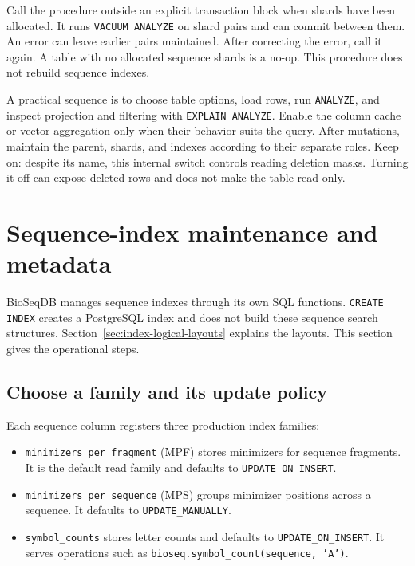 Call the procedure outside an explicit transaction block when shards have
been allocated. It runs \texttt{VACUUM ANALYZE} on shard pairs and can
commit between them. An error can leave earlier pairs maintained. After
correcting the error, call it again. A table with no allocated sequence
shards is a no-op. This procedure does not rebuild sequence indexes.

A practical sequence is to choose table options, load rows, run
\texttt{ANALYZE}, and inspect projection and filtering with
\texttt{EXPLAIN ANALYZE}. Enable the column cache or vector aggregation
only when their behavior suits the query. After mutations, maintain the
parent, shards, and indexes according to their separate roles.
Keep  on: despite its name, this internal
switch controls reading deletion masks. Turning it off can expose deleted
rows and does not make the table read-only.

\section{Sequence-index maintenance and metadata}
\label{sec:appendix-indexes}

BioSeqDB manages sequence indexes through its own SQL functions.
\texttt{CREATE INDEX} creates a PostgreSQL index and does not build these
sequence search structures. Section~\ref{sec:index-logical-layouts}
explains the layouts. This section gives the operational steps.

\subsection{Choose a family and its update policy}

Each sequence column registers three production index families:
\begin{itemize}
  \item \texttt{minimizers\_per\_fragment} (MPF) stores minimizers for
    sequence fragments. It is the default read family and defaults to
    \texttt{UPDATE\_ON\_INSERT}.
  \item \texttt{minimizers\_per\_sequence} (MPS) groups minimizer
    positions across a sequence. It defaults to
    \texttt{UPDATE\_MANUALLY}.
  \item \texttt{symbol\_counts} stores letter counts and defaults to
    \texttt{UPDATE\_ON\_INSERT}. It serves operations such as
    \texttt{bioseq.symbol\_count(sequence, 'A')}.
\end{itemize}

